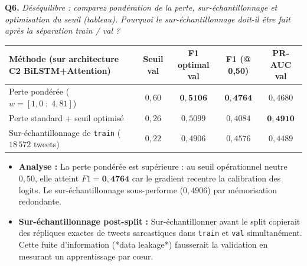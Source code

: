 \documentclass[10pt,a4paper]{article}
\newcommand{\questiontitle}[2]{%
  \noindent\textbf{#1.} \textit{#2}\par\vspace{1.5pt}%
}
\begin{document}
\questiontitle{Q6}{Déséquilibre : comparez pondération de la perte, sur-échantillonnage et optimisation du seuil (tableau). Pourquoi le sur-échantillonnage doit-il être fait après la séparation train / val ?}
\begin{tcolorbox}[reponsebox]
  \centering
  \begin{tabularx}{\linewidth}{X c c c c}
    \toprule
    \textbf{Méthode (sur architecture C2 BiLSTM+Attention)} & \textbf{Seuil val} & \textbf{F1 optimal val} & \textbf{F1 (@ 0,50)} & \textbf{PR-AUC val} \\
    \midrule
    Perte pondérée ($w = [1{,}0 \;;\; 4{,}81]$) & $0{,}60$ & $\mathbf{0{,}5106}$ & $\mathbf{0{,}4764}$ & $0{,}4680$ \\
    Perte standard + seuil optimisé & $0{,}26$ & $0{,}5099$ & $0{,}4084$ & $\mathbf{0{,}4910}$ \\
    Sur-échantillonnage de \texttt{train} ($18\,572$ tweets) & $0{,}22$ & $0{,}4906$ & $0{,}4576$ & $0{,}4489$ \\
    \bottomrule
  \end{tabularx}
  \vspace{2pt}
  \begin{itemize}
    \item \textbf{Analyse :} La perte pondérée est supérieure : au seuil opérationnel neutre $0{,}50$, elle atteint $F1 = \mathbf{0{,}4764}$ car le gradient recentre la calibration des logits. Le sur-échantillonnage sous-performe ($0{,}4906$) par mémorisation redondante.
    \item \textbf{Sur-échantillonnage post-split :} Sur-échantillonner avant le split copierait des répliques exactes de tweets sarcastiques dans \texttt{train} et \texttt{val} simultanément. Cette fuite d'information (*data leakage*) fausserait la validation en mesurant un apprentissage par cœur.
  \end{itemize}
\end{tcolorbox}
\end{document}
